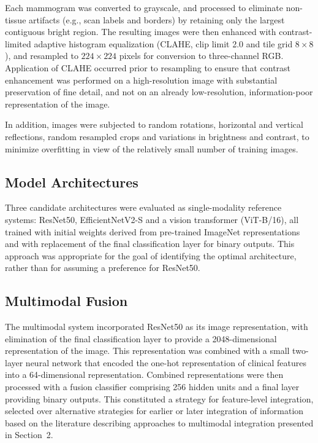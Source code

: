 Each mammogram was converted to grayscale, and processed to eliminate non-tissue artifacts (e.g., scan labels and borders) by retaining only the largest contiguous bright region. The resulting images were then enhanced with contrast-limited adaptive histogram equalization (CLAHE, clip limit 2.0 and tile grid $8 \times 8$), and resampled to $224 \times 224$ pixels for conversion to three-channel RGB. Application of CLAHE occurred prior to resampling to ensure that contrast enhancement was performed on a high-resolution image with substantial preservation of fine detail, and not on an already low-resolution, information-poor representation of the image.

In addition, images were subjected to random rotations, horizontal and vertical reflections, random resampled crops and variations in brightness and contrast, to minimize overfitting in view of the relatively small number of training images.

\subsection{Model Architectures}
Three candidate architectures were evaluated as single-modality reference systems: ResNet50, EfficientNetV2-S and a vision transformer (ViT-B/16), all trained with initial weights derived from pre-trained ImageNet representations and with replacement of the final classification layer for binary outputs. This approach was appropriate for the goal of identifying the optimal architecture, rather than for assuming a preference for ResNet50.

\subsection{Multimodal Fusion}
The multimodal system incorporated ResNet50 as its image representation, with elimination of the final classification layer to provide a 2048-dimensional representation of the image. This representation was combined with a small two-layer neural network that encoded the one-hot representation of clinical features into a 64-dimensional representation. Combined representations were then processed with a fusion classifier comprising 256 hidden units and a final layer providing binary outputs. This constituted a strategy for feature-level integration, selected over alternative strategies for earlier or later integration of information based on the literature describing approaches to multimodal integration presented in Section~2.

